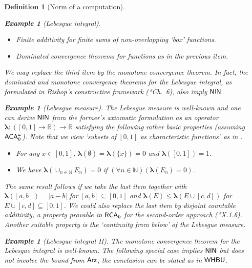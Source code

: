 \documentclass[reqno]{amsart}
\newtheorem{defi}[thm]{Definition}
\newtheorem{exa}[thm]{Example}
\def\RCA{\textup{\textsf{RCA}}}
\def\ACAo{\textup{\textsf{ACA}}_{0}^{\omega}}
\def\N{{\mathbb  N}}
\def\R{{\mathbb  R}}
\def\di{\rightarrow}
\def\Arz{\textup{\textsf{Arz}}}
\def\NIN{\textup{\textsf{NIN}}}
\def\blambda{\pmb{\lambda}}
\def\WHBU{\textup{\textsf{WHBU}}}
\numberwithin{equation}{section}
\numberwithin{thm}{section}
\begin{document}
\begin{defi}[Norm of a computation]
\begin{exa}[Lebesgue integral]
\begin{itemize}
\item Finite additivity for finite sums of non-overlapping `box' functions. 
\item Dominated convergence theorems for functions as in the previous item. 
\end{itemize}
We may replace the third item by the monotone convergence theorem.  In fact, the dominated and monotone convergence theorems for the Lebesgue integral, as formulated in Bishop's constructive framework (\cite{bish1}*{Ch.\ 6}), also imply $\NIN$.  
\end{exa}
\begin{exa}[Lebesgue measure]\label{frag}\rm
The Lebesgue measure is well-known and one can derive $\NIN$ from the former's axiomatic formulation as an operator $\blambda:([0,1]\di \R)\di \R$ satisfying the following rather basic properties (assuming $\ACAo$). 
Note that we view `subsets of $[0,1]$ as characteristic functions' as in \cite{dagsamVI, kruisje, dagsamVII}.
\begin{itemize}
\item For any $x\in [0,1]$, $\blambda(\emptyset)=\blambda(\{x\})=0$ and $\blambda([0,1])=1$.
\item We have $\blambda(\cup_{n\in \N}E_{n})=0$ if $(\forall n\in \N)(\blambda(E_{n})=0)$.
\end{itemize}
The same result follows if we take the last item together with $\blambda([a,b])=|a-b|$ for $[a, b]\subseteq [0,1]$ and $\blambda(E)\leq \blambda(E\cup [c,d] )$ for $E\cup [c, d]\subseteq [0,1]$.  
We could also replace the last item by \emph{disjoint} countable additivity, a property provable in $\RCA_{0}$ for the second-order approach (\cite{simpson2}*{X.1.6}).
Another suitable property is the `continuity from below' of the Lebesgue measure.  
\end{exa}
\begin{exa}[Lebesgue integral II]\rm
The monotone convergence theorem for the Lebesgue integral is well-known.  The following special case implies $\NIN$ but does not involve the bound from $\Arz$; the conclusion can be stated as in $\WHBU$.
\begin{center}

\end{center}
\end{exa}
\end{defi}
\end{document}
